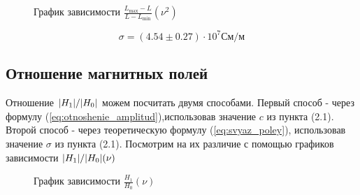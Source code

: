 \documentclass[a4paper, 12pt]{article}
\begin{document}
\newpage

\begin{figure}[h]
    \caption{График зависимости $\frac{L_{\max} - L}{L - L_{\min}} (\nu^2)$}\label{fig:L_nu_linearized}
    \newpage
\end{figure}
\begin{equation}
    \sigma = (4.54 \pm 0.27) \cdot 10^7 \text{См/м}
\end{equation}

\newpage
\subsection{Отношение магнитных полей}
Отношение $\abs{H_1}/\abs{H_0}$ можем посчитать двумя способами. Первый способ - через
формулу (\ref{eq:otnoshenie_amplitud}),использовав значение $c$ из пункта (2.1).
Второй способ - через теоретическую формулу (\ref{eq:svyaz_poley}), использовав значение
$\sigma$ из пункта (2.1). Посмотрим на их различие с помощью графиков зависимости
$\abs{H_1}/\abs{H_0} (\nu)$
\begin{figure}[h]
    \caption{График зависимости $\frac{H_1}{H_0}(\nu)$}\label{fig:L_nu_linearized}
    \newpage
\end{figure}
\end{document}
